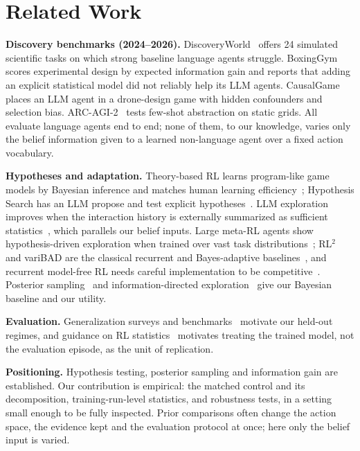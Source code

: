 \documentclass[conference]{IEEEtran}
\begin{document}
\section{Related Work}
\textbf{Discovery benchmarks (2024--2026).} DiscoveryWorld~\cite{jansen2024} offers 24 simulated scientific tasks on which strong baseline language agents struggle. BoxingGym~\cite{gandhi2025} scores experimental design by expected information gain and reports that adding an explicit statistical model did not reliably help its LLM agents. CausalGame~\cite{chen2026causalgame} places an LLM agent in a drone-design game with hidden confounders and selection bias. ARC-AGI-2~\cite{chollet2025arc2} tests few-shot abstraction on static grids. All evaluate language agents end to end; none of them, to our knowledge, varies only the belief information given to a learned non-language agent over a fixed action vocabulary.

\textbf{Hypotheses and adaptation.} Theory-based RL learns program-like game models by Bayesian inference and matches human learning efficiency~\cite{tsividis2021}; Hypothesis Search has an LLM propose and test explicit hypotheses~\cite{wang2024hs}. LLM exploration improves when the interaction history is externally summarized as sufficient statistics~\cite{krishnamurthy2024}, which parallels our belief inputs. Large meta-RL agents show hypothesis-driven exploration when trained over vast task distributions~\cite{ada2023}; RL$^2$ and variBAD are the classical recurrent and Bayes-adaptive baselines~\cite{duan2016,zintgraf2020}, and recurrent model-free RL needs careful implementation to be competitive~\cite{ni2022}. Posterior sampling~\cite{strens2000,osband2013} and information-directed exploration~\cite{russo2014} give our Bayesian baseline and our utility.

\textbf{Evaluation.} Generalization surveys and benchmarks~\cite{kirk2023,chevalier2023,cobbe2020} motivate our held-out regimes, and guidance on RL statistics~\cite{agarwal2021,patterson2024} motivates treating the trained model, not the evaluation episode, as the unit of replication.

\textbf{Positioning.} Hypothesis testing, posterior sampling and information gain are established. Our contribution is empirical: the matched control and its decomposition, training-run-level statistics, and robustness tests, in a setting small enough to be fully inspected. Prior comparisons often change the action space, the evidence kept and the evaluation protocol at once; here only the belief input is varied.
\end{document}
